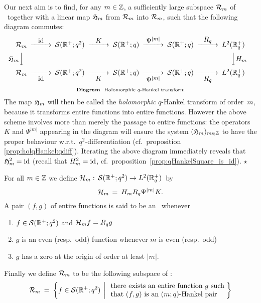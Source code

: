 \begin{abs} \label{abs:holomorphic_qHankel}\rm
Our next aim is to find, for any $m\in\mathbb{Z}$, a sufficiently large subspace
${\mathcal R}_{m}$ of \Swqbis\ together with a linear map $\mathfrak{H}_{m}$ from ${\mathcal R}_{m}$
into ${\mathcal R}_{m}$, such that the following diagram commutes:
$$\begin{CD}
  \holS{m} @>\id>>
  \Swqbis  @>{\textstyle K}>>
  \Swq     @>{\textstyle \Psi^{|m|}}>>
  \Swq     @>{\textstyle R_q}>>
  \Ltwoq \\
  @V{\textstyle\holH{m}}VV @. @. @. @VV{\textstyle H_m}V  \\
  \holS{m} @>>\id>
  \Swqbis  @>>{\textstyle K}>
  \Swq     @>>{\textstyle \Psi^{|m|}}>
  \Swq     @>>{\textstyle R_q}>
  \Ltwoq
\end{CD}$$
\nopagebreak
\begin{equation}\label{eq:diagram:holomorphic_qHankel}
\mbox{\scriptsize {\bf Diagram}\hspace{3pt}\ Holomorphic $q$-Hankel transform}
\end{equation}
The map $\mathfrak{H}_{m}$ will then be called the {\em holomorphic\/} $q$-Hankel transform
of \mbox{order $m$}, because it transforms entire functions into entire functions.
However the above scheme involves more than merely the passage to entire functions:
the operators $K$ and $\Psi^{|m|}$ appearing in the diagram will ensure
the system $(\mathfrak{H}_{m})_{m\in\mathbb{Z}}$ to have the proper behaviour w.r.t.\
$q^2$-differentiation (cf.\ proposition \ref{prop:holqHankel:qdiff}).
Iterating the above diagram immediately reveals that $\mathfrak{H}_{m}^2=\mbox{\rm id}$
(recall that $H_m^2=\mbox{\rm id}$, \mbox{cf.\ proposition}\ \ref{prop:qHankelSquare_is_id}).
\hfill $\star$
\end{abs}



\begin{defn*} \label{def:Hmpair}
For all $m\in\mathbb{Z}$ we define ${\mathcal H}_{m} : \, {\mathcal S}(\mathbb{R}^+;q^2) \rightarrow L^2(\mathbb{R}_q^+)\,$ by
$$ {\mathcal H}_{m} \,=\: H_m R_q \Psi^{|m|} K. $$
A pair $(f,g)$ of entire functions is said to be an \Hmpair\ whenever
\begin{enumerate}
\item $f\in {\mathcal S}(\mathbb{R}^+;q^2)$ and ${\mathcal H}_{m} f = R_q g$
\item $g$ is an even (resp.\ odd) function whenever $m$ is even (resp.\ odd)
\item $g$ has a zero at the origin of order at least $|m|$.
\end{enumerate}
Finally we define ${\mathcal R}_{m}$ to be the following subspace of \Swqbis:
$$ {\mathcal R}_{m} \:= \: \left\{ f\in {\mathcal S}(\mathbb{R}^+;q^2) \:\left|\:
                \begin{array}{l}
                   \mbox{there exists an entire function $g$ such} \\
                   \mbox{that $(f,g)$ is an \mbox{$(m;q)$-Hankel} pair}
                \end{array}\!\! \right.\right\}$$
\end{defn*}



